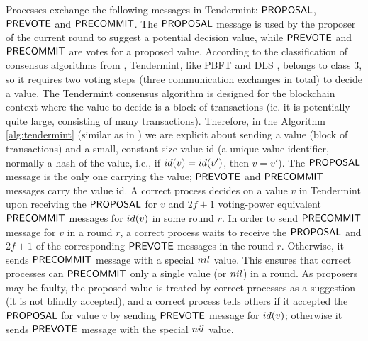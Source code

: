 Processes exchange the following messages in Tendermint: $\mathsf{PROPOSAL}$,
$\mathsf{PREVOTE}$ and $\mathsf{PRECOMMIT}$. The $\mathsf{PROPOSAL}$ message is used by the proposer of
the current round to suggest a potential decision value, while $\mathsf{PREVOTE}$ and
$\mathsf{PRECOMMIT}$ are votes for a proposed value. According to the classification of
consensus algorithms from \cite{RMS10:dsn}, Tendermint, like PBFT
\cite{CL02:tcs} and DLS \cite{DLS88:jacm}, belongs to class 3, so it requires
two voting steps (three communication exchanges in total) to decide a value.
The Tendermint consensus algorithm is designed for the blockchain context where
the value to decide is a block of transactions (ie. it is potentially quite
large, consisting of many transactions). Therefore, in the Algorithm
\ref{alg:tendermint} (similar as in \cite{CL02:tcs}) we are explicit about
sending a value (block of transactions) and a small, constant size value id (a
unique value identifier, normally a hash of the value, i.e., if $id(v) =
id(v')$, then $v=v'$). The $\mathsf{PROPOSAL}$ message is the only one carrying the
value; $\mathsf{PREVOTE}$ and $\mathsf{PRECOMMIT}$ messages carry the value id.  A correct
process decides on a value $v$ in Tendermint upon receiving the $\mathsf{PROPOSAL}$ for
$v$ and $2f+1$ voting-power equivalent $\mathsf{PRECOMMIT}$ messages for $id(v)$ in
some round $r$. In order to send $\mathsf{PRECOMMIT}$ message for $v$ in a round $r$, a
correct process waits to receive the $\mathsf{PROPOSAL}$ and $2f+1$ of the
corresponding $\mathsf{PREVOTE}$ messages in the round $r$. Otherwise, 
it sends $\mathsf{PRECOMMIT}$ message with a special $nil$ value.  
This ensures that correct processes can $\mathsf{PRECOMMIT}$ only a 
single value (or $nil$) in a round.  As
proposers may be faulty, the proposed value is treated by correct processes as
a suggestion (it is not blindly accepted), and a correct process tells others
if it accepted the $\mathsf{PROPOSAL}$ for value $v$ by sending $\mathsf{PREVOTE}$ message for
$id(v)$; otherwise it sends $\mathsf{PREVOTE}$ message with the special $nil$ value. 

